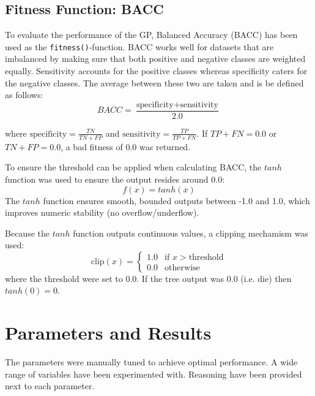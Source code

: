 \documentclass{article}
\begin{document}
\subsection{Fitness Function: BACC}
\label{fitness}
To evaluate the performance of the GP, Balanced Accuracy (BACC) has been used as the \texttt{fitness()}-function. BACC works well for datasets that are imbalanced by making sure that both positive and negative classes are weighted equally. Sensitivity accounts for the positive classes whereas specificity caters for the negative classes. The average between these two are taken and is be defined as follows:
\begin{equation}\label{BACC}
  BACC = \frac{\text{specificity} + \text{sensitivity}}{2.0}
\end{equation}

where \(\text{specificity} = \frac{TN}{TN + FP}\) and \(\text{sensitivity} = \frac{TP}{TP + FN}\). If \(TP + FN = 0.0\) or \(TN + FP = 0.0\), a bad fitness of \(0.0\) was returned.

To ensure the threshold can be applied when calculating BACC, the \(tanh\) function was used to ensure the output resides around \(0.0\):
\begin{equation}\label{eq:sigmoid}
  f(x) = tanh(x)
\end{equation}
The \(tanh\) function ensures smooth, bounded outputs between -1.0 and 1.0, which improves numeric stability (no overflow/underflow).

Because the \(tanh\) function outputs continuous values, a clipping mechamism was used:
\begin{equation}
\text{clip}(x)=
    \begin{cases}
        1.0 & \text{if } x > \text{threshold}\\
        0.0 & \text{otherwise}
    \end{cases}
\end{equation}
where the threshold were set to 0.0. If the tree output was 0.0 (i.e. die) then \(tanh(0) = 0\).

\section{Parameters and Results}
\label{GPsetup}
The parameters were manually tuned to achieve optimal performance. A wide range of variables have been experimented with. Reasoning have been provided next to each parameter.
\end{document}
